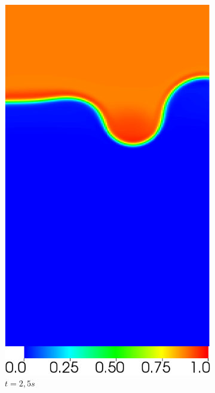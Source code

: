\begin{figure}[H]
\begin{subfigure}[ht!]{0.2\textwidth}
		\includegraphics[width=1\textwidth]{figure/PT_RT/concent1/visit0002.png}
		\caption{$t=2,5s$}
	\end{subfigure}
	\begin{subfigure}[ht!]{0.2\textwidth}
		\centering

\end{subfigure}
\end{figure}

